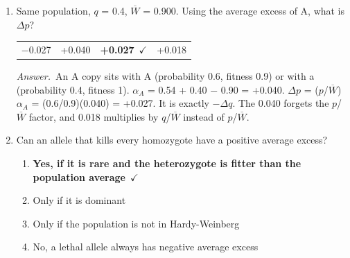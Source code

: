 \documentclass[11pt]{article}
\newcommand{\keyans}[1]{\par\medskip\noindent\textit{Answer.}\ #1\par\medskip}
\begin{document}
\begin{enumerate}[label=\textbf{\arabic*.}, leftmargin=2em, itemsep=1.4em]
\begin{tabularx}{\linewidth}{@{}YYYY@{}}
\end{tabularx}
\keyans{\(q'\) = (0.24 + 0.096)/0.9 = 0.373. Random mating restores Hardy-Weinberg at \(q'\), so \(p'^{2}\) = 0.393, \(2p'q'\) = 0.468 and \(q'^{2}\) = 0.139. \(\overline{W}\) = 0.393(0.9) + 0.468(1) + 0.139(0.6) = 0.905. It rose from 0.900. The 0.921 is the average fitness of the survivors themselves, not of the next generation.}
\item Same population, \(q\) = 0.4, \(\overline{W}\) = 0.900. Using the average excess of A, what is \(\Delta p\)?
\nopagebreak\par{}
\par\smallskip\noindent\begin{tabularx}{\linewidth}{@{}YYYY@{}}
\(-\)0.027 & +0.040 & \textbf{+0.027}\ \(\checkmark\) & +0.018 \\
\end{tabularx}
\keyans{An A copy sits with A (probability 0.6, fitness 0.9) or with a (probability 0.4, fitness 1). \(\alpha_{A}\) = 0.54 + 0.40 \(-\) 0.90 = +0.040. \(\Delta p\) = (\(p\)/\(\overline{W}\))\(\alpha_{A}\) = (0.6/0.9)(0.040) = +0.027. It is exactly \(- \Delta q\). The 0.040 forgets the \(p\)/\(\overline{W}\) factor, and 0.018 multiplies by \(q\)/\(\overline{W}\) instead of \(p\)/\(\overline{W}\).}
\item Can an allele that kills every homozygote have a positive average excess?
\nopagebreak\par{}
\par\smallskip
\begin{enumerate}[label={}, leftmargin=2.4em, labelwidth=0pt, itemsep=2pt, topsep=0pt]
\item \hspace*{-2.4em}\textbf{Yes, if it is rare and the heterozygote is fitter than the population average}\ \(\checkmark\)
\item \hspace*{-2.4em}Only if it is dominant
\item \hspace*{-2.4em}Only if the population is not in Hardy-Weinberg
\item \hspace*{-2.4em}No, a lethal allele always has negative average excess

\end{enumerate}
\end{enumerate}
\end{document}
